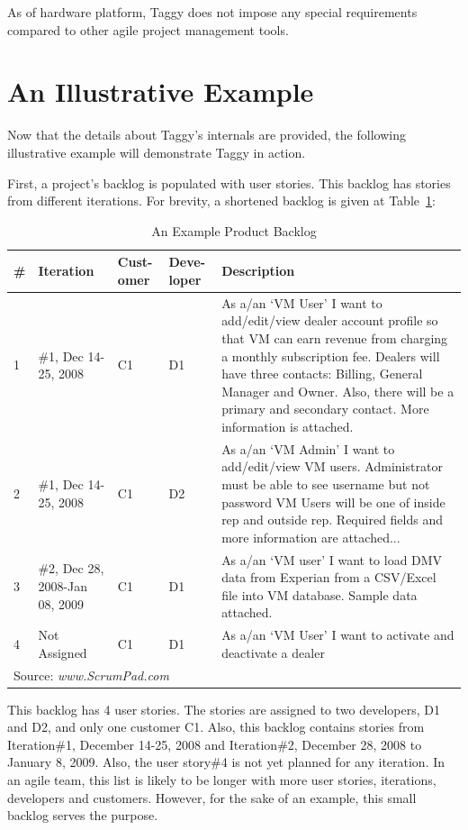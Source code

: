 As of hardware platform, Taggy does not impose any special requirements compared to other agile project management tools.

\section{An Illustrative Example}	
Now that the details about Taggy's internals are provided, the following illustrative example will demonstrate Taggy in action.

First, a project's backlog is populated with user stories. This backlog has stories from different iterations. For brevity, a shortened backlog is given at Table~\ref{tab:backlog}:

\begin{table}
  \centering
  \caption{An Example Product Backlog}
    \begin{tabular}{|p{0.5cm}|p{1.7cm}|p{1.2cm}|p{1.2cm}|p{7cm}|}
      \hline
      \textbf{\#} & \textbf{Iteration} & \textbf{Cust- omer} & \textbf{Deve- loper} & \textbf{Description}\\
      \hline
		1 & \#1, Dec 14-25, 2008 & C1 & D1 & As a/an `VM User' I want to add/edit/view dealer account profile so that VM can earn revenue from charging a monthly subscription fee.
			Dealers will have three contacts: Billing, General Manager and Owner. Also, there will be a primary and secondary contact. More information is attached.\\
      \hline
		2 & \#1, Dec 14-25, 2008 & C1 & D2 & As a/an `VM Admin' I want to add/edit/view VM users. 
		Administrator must be able to see username but not password VM Users will be one of inside rep and outside rep. 
		Required fields and more information are attached...\\
	  \hline
		3 & \#2, Dec 28, 2008-Jan 08, 2009 & C1 & D1 & As a/an `VM user' I want to load DMV data from Experian from a CSV/Excel file into VM database. Sample data attached.\\
	  \hline
		4 & Not Assigned & C1 & D1 & As a/an `VM User' I want to activate and deactivate a dealer\\
	  \hline
      \multicolumn{4}{l}{Source: \emph{www.ScrumPad.com}}
    \end{tabular}
		\label{tab:backlog}
\end{table}

This backlog has 4 user stories. The stories are assigned to two developers, D1 and D2, and only one customer C1. Also, this backlog contains stories from Iteration\#1, December 14-25, 2008 and Iteration\#2, December 28, 2008 to January 8, 2009. Also, the user story\#4 is not yet planned for any iteration. In an agile team, this list is likely to be longer with more user stories, iterations, developers and customers. However, for the sake of an example, this small backlog serves the purpose.

